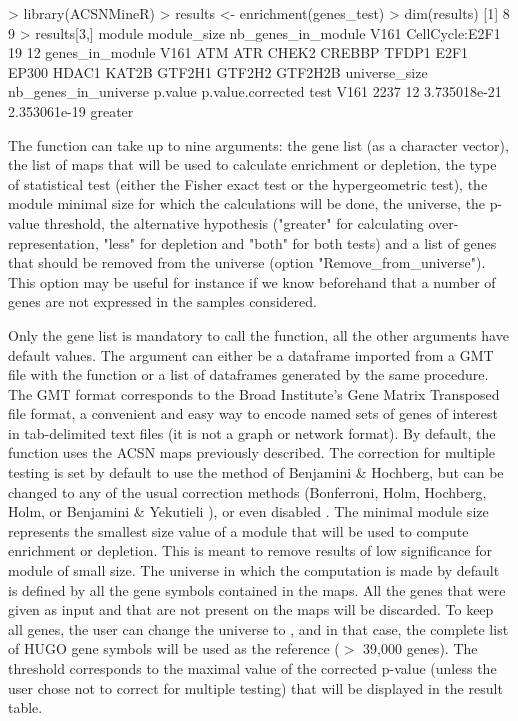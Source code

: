 \begin{example}
> library(ACSNMineR)
> results <- enrichment(genes_test)
> dim(results)
[1] 8  9
> results[3,]
            module module_size nb_genes_in_module
V161 CellCycle:E2F1          19                 12
                                                             genes_in_module
V161 ATM ATR CHEK2 CREBBP TFDP1 E2F1 EP300 HDAC1 KAT2B GTF2H1 GTF2H2 GTF2H2B
     universe_size nb_genes_in_universe      p.value p.value.corrected    test
V161          2237                   12 3.735018e-21      2.353061e-19 greater
\end{example}



The  function can take up to nine arguments: the gene list (as
a character vector), the list of maps that will be used to calculate enrichment
or depletion, the type of statistical test (either the Fisher exact test or the
hypergeometric test), the module minimal size for which the calculations will
be done, the universe, the p-value threshold, the alternative hypothesis
("greater" for calculating over-representation, "less" for depletion and "both"
for both tests) and a list of genes that should be removed from the universe
(option "Remove\_from\_universe"). This option may be useful for instance if we
know beforehand that a number of genes are not expressed in the samples
considered.

Only the gene list is mandatory to call the  function, all the
other arguments have default values.  The  argument can either be a
dataframe imported from a GMT file with the  function
or a list of dataframes generated by the same procedure. The GMT format
corresponds to the Broad Institute's Gene Matrix Transposed file format, a
convenient and easy way to encode named sets of genes of interest in
tab-delimited text files (it is not a graph or network format). By default, the
function  uses the ACSN maps previously described.  The
correction for multiple testing is set by default to use the method of
Benjamini \& Hochberg, but can be changed to any of the usual correction
methods (Bonferroni, Holm, Hochberg, Holm, or Benjamini \& Yekutieli
\citep{Benjamini2003FDR}), or even disabled .  The minimal module size
represents the smallest size value of a module that will be used to compute
enrichment or depletion. This is meant to remove results of low significance
for module of small size.  The universe in which the computation is made by
default is defined by all the gene symbols contained in the maps. All the genes
that were given as input and that are not present on the maps will be
discarded. To keep all genes, the user can change the universe to ,
and in that case, the complete list of HUGO gene symbols will be used as the
reference ($>$ 39,000 genes). The threshold corresponds to the maximal value of
the corrected p-value (unless the user chose not to correct for multiple
testing) that will be displayed in the result table.


